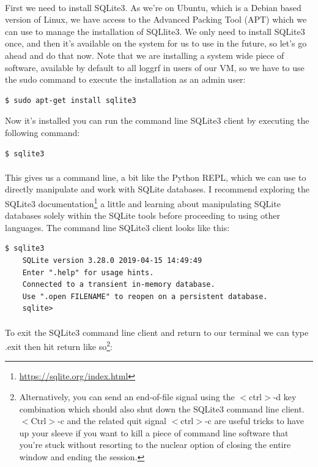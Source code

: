 \documentclass[12pt, a4paper, oneside]{book}
\begin{document}
{\paragraph{} First we need to install SQLite3. As we're on Ubuntu, which is a Debian based version of Linux, we have access to the Advanced Packing Tool (APT) which we can use to manage the installation of SQLlite3. We only need to install SQLite3 once, and then it's available on the system for us to use in the future, so let's go ahead and do that now. Note that we are installing a system wide piece of software, available by default to all loggrf in users of our VM, so we have to use the sudo command to execute the installation as an admin user:


\begin{lstlisting}[style=DOS]
    $ sudo apt-get install sqlite3
\end{lstlisting}

Now it's installed you can run the command line SQLite3 client by executing the following command:

\begin{lstlisting}[style=DOS]
    $ sqlite3
\end{lstlisting}

\paragraph{} This gives us a command line, a bit like the Python REPL, which we can use to directly manipulate and work with SQLite databases. I recommend exploring the SQLite3 documentation\footnote{\url{https://sqlite.org/index.html}} a little and learning about manipulating SQLite databases solely within the SQLite tools before proceeding to using other languages. The command line SQLite3 client looks like this:

\begin{lstlisting}[style=DOS]
    $ sqlite3 
    SQLite version 3.28.0 2019-04-15 14:49:49
    Enter ".help" for usage hints.
    Connected to a transient in-memory database.
    Use ".open FILENAME" to reopen on a persistent database.
    sqlite> 
\end{lstlisting}

\paragraph{} To exit the SQLite3 command line client and return to our terminal we can type .exit then hit return like so\footnote{Alternatively, you can send an end-of-file signal using the $<$ctrl$>$-d key combination which should also shut down the SQLite3 command line client. $<$Ctrl$>$-c and the related quit signal $<$ctrl$>$-c are useful tricks to have up your sleeve if you want to kill a piece of command line software that you're stuck without resorting to the nuclear option of closing the entire window and ending the session.}:

}
\end{document}
